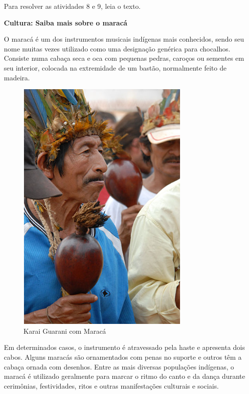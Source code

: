 
\pagebreak

Para resolver as atividades 8 e 9, leia o texto.\bigskip

\begin{myquote}
\textbf{Cultura: Saiba mais sobre o maracá}

O maracá é um dos instrumentos musicais indígenas mais conhecidos, sendo
seu nome muitas vezes utilizado como uma designação genérica para
chocalhos. Consiste numa cabaça seca e oca com pequenas pedras, caroços
ou sementes em seu interior, colocada na extremidade de um bastão,
normalmente feito de madeira.

\begin{figure}
\includegraphics[width=.5\textwidth]{./imgs/art18.png}
\caption{Karai Guarani com Maracá}
\end{figure}

Em determinados casos, o instrumento é atravessado pela haste e
apresenta dois cabos. Alguns maracás são ornamentados com penas no
suporte e outros têm a cabaça ornada com desenhos. Entre as mais
diversas populações indígenas, o maracá é utilizado geralmente para
marcar o ritmo do canto e da dança durante cerimônias, festividades,
ritos e outras manifestações culturais e sociais.



\end{myquote}
